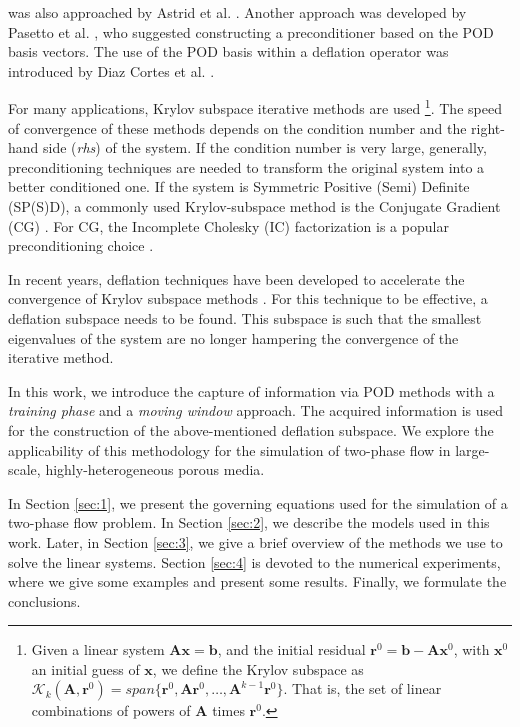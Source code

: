 \documentclass[times,final]{elsarticle}
\begin{document}
was also approached by Astrid et al. \cite{Astrid11}. Another approach was developed by Pasetto et 
al. \cite{Pasetto16}, who suggested constructing a preconditioner based on the POD basis vectors. The use of the POD basis 
within a deflation operator was introduced by Diaz Cortes et al. \cite{Diaz17}.\par
For many applications, Krylov subspace iterative
methods are used \cite{Saad03,vanderVorst03}\footnote{Given a linear system $\mathbf{A}\mathbf{x}=\mathbf{b}$, and the initial 
residual $\mathbf{r}^0=\mathbf{b}-\mathbf{A}\mathbf{x}^0$, with $\mathbf{x}^0$ an initial guess of $\mathbf{x}$, we define the Krylov subspace as
$\mathcal{K}_k(\mathbf{A},\mathbf{r}^0)=span\{\mathbf{r}^0,\mathbf{A}\mathbf{r}^0,\dots,\mathbf{A}^{k-1}\mathbf{r}^0\}$. 
That is, the set of linear combinations of powers of $\mathbf{A}$ times $\mathbf{r}^0$. }. The speed of convergence of these 
methods depends on the condition number and the right-hand side (\emph{rhs}) of the system. If the condition 
number is very large, generally, preconditioning techniques are needed to transform the original system into a 
better conditioned one. If the system is Symmetric Positive (Semi) Definite (SP(S)D), a commonly used Krylov-subspace method is the 
Conjugate Gradient (CG) \cite{vanderVorst88,Vuik99,Vuik02,Tang09,Carlberg15}. For CG, the Incomplete Cholesky (IC) factorization is a popular preconditioning 
choice \cite{vanderVorst88,Benzi02}.\par 
In recent years, deflation techniques have been developed to accelerate the convergence of
Krylov subspace methods \cite{Vuik99,Vuik02,Tang07,Tang08,Tang09}. For this technique to be effective, a deflation subspace needs to be found. This subspace is such that the smallest eigenvalues of the 
system are no longer hampering the convergence of the iterative method. \par
In this work, we introduce the capture of information via POD methods with a \emph{training phase} and a \emph{moving window} 
approach. The acquired information is used for the construction of the above-mentioned deflation subspace.
We explore the applicability of this methodology for the simulation of two-phase flow in large-scale, highly-heterogeneous porous media. \par

In Section \ref{sec:1}, we present the governing equations used for the simulation of a two-phase flow problem. In Section \ref{sec:2}, we describe the models used in this work. Later, in 
Section \ref{sec:3}, we give a brief overview of the methods we use to solve the linear systems. 
Section \ref{sec:4} is devoted to the numerical experiments, where we give some examples and 
present some results. Finally, we formulate the conclusions.\par
\end{document}
